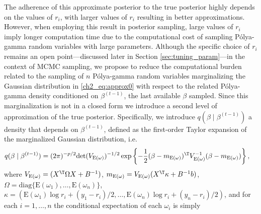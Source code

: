 The adherence of this approximate posterior to the true posterior highly depends on the values of $r_i$, with larger values of $r_i$ resulting in better approximations. However, when employing this result in posterior sampling, large values of $r_i$ imply longer computation time due to the computational cost of sampling P\'olya-gamma random variables with large parameters. Although the specific choice of $r_i$ remains an open point---discussed later in Section \ref{sec:tuning_param}---in the context of MCMC sampling, we propose to reduce the computational burden related to the sampling of $n$  P\'olya-gamma  random variables marginalizing the Gaussian distribution in \eqref{ch2_eq:approx0} with respect to the related P\'olya-gamma density conditioned on $\beta^{(t-1)}$,  the last available $\beta$ sampled. Since this marginalization is not in a closed form we introduce a second level of approximation of the true posterior. Specifically, we introduce $q(\beta \mid \beta^{(t-1)})$ a density that depends on $\beta^{(t-1)}$, defined as the first-order Taylor expansion of the marginalized Gaussian distribution, i.e. 
\begin{equation}
\begin{aligned}
q(\beta\mid \beta^{(t-1)}) & = %
(2\pi)^{-p/2} \mathrm{det}(V_{\mathrm{E}(\omega)})^{-1/2} \exp\left\{-\frac{1}{2}(\beta - m_{\mathrm{E}(\omega)})^\T V_{\mathrm{E}(\omega)}^{-1} (\beta - m_{\mathrm{E}(\omega)})\right\},
\end{aligned}
\label{ch2_eq:approx2}
\end{equation}
where $V_{\mathrm{E}(\omega)} = (X^\T \Omega X + B^{-1})$, $m_{\mathrm{E}(\omega)} = V_{\mathrm{E}(\omega)}(X^\T \kappa + B^{-1}b)$, 
$\Omega = \mathrm{diag} \{ \mathrm{E}(\omega_1),\dots,\mathrm{E}(\omega_n)\}$, $\kappa = (\mathrm{E}(\omega_1) \log r_i + (y_1-r_i)/2, \dots, \mathrm{E}(\omega_n) \log r_i + (y_n-r_i)/2)$, and for each $i = 1, \dots, n$ the conditional expectation of each $\omega_i$ is simply 
